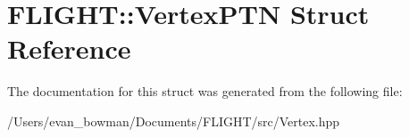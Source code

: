 \hypertarget{struct_f_l_i_g_h_t_1_1_vertex_p_t_n}{}\section{F\+L\+I\+G\+HT\+:\+:Vertex\+P\+TN Struct Reference}
\label{struct_f_l_i_g_h_t_1_1_vertex_p_t_n}


The documentation for this struct was generated from the following file\+:\begin{DoxyCompactItemize}
\item 
/\+Users/evan\+\_\+bowman/\+Documents/\+F\+L\+I\+G\+H\+T/src/Vertex.\+hpp\end{DoxyCompactItemize}
